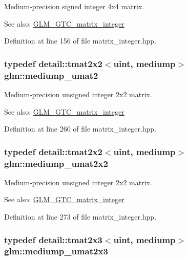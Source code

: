 Medium-precision signed integer 4x4 matrix. \begin{Desc}
\item[See also:]\hyperlink{group__gtc__matrix__integer}{GLM\_\-GTC\_\-matrix\_\-integer} \end{Desc}


Definition at line 156 of file matrix\_\-integer.hpp.\hypertarget{group__gtc__matrix__integer_g388a5b9d7e494d5f5bd30b9e11ded06a}{
\subsubsection[mediump\_\-umat2]{\setlength{\rightskip}{0pt plus 5cm}typedef detail::tmat2x2$<$uint, mediump$>$ {\bf glm::mediump\_\-umat2}}}
\label{group__gtc__matrix__integer_g388a5b9d7e494d5f5bd30b9e11ded06a}


Medium-precision unsigned integer 2x2 matrix. \begin{Desc}
\item[See also:]\hyperlink{group__gtc__matrix__integer}{GLM\_\-GTC\_\-matrix\_\-integer} \end{Desc}


Definition at line 260 of file matrix\_\-integer.hpp.\hypertarget{group__gtc__matrix__integer_g80e478f09c6caa16410198ce78fe8a2b}{
\subsubsection[mediump\_\-umat2x2]{\setlength{\rightskip}{0pt plus 5cm}typedef detail::tmat2x2$<$uint, mediump$>$ {\bf glm::mediump\_\-umat2x2}}}
\label{group__gtc__matrix__integer_g80e478f09c6caa16410198ce78fe8a2b}


Medium-precision unsigned integer 2x2 matrix. \begin{Desc}
\item[See also:]\hyperlink{group__gtc__matrix__integer}{GLM\_\-GTC\_\-matrix\_\-integer} \end{Desc}


Definition at line 273 of file matrix\_\-integer.hpp.\hypertarget{group__gtc__matrix__integer_gaae45c5dbaad1ecd57bfa936d851be1b}{
\subsubsection[mediump\_\-umat2x3]{\setlength{\rightskip}{0pt plus 5cm}typedef detail::tmat2x3$<$uint, mediump$>$ {\bf glm::mediump\_\-umat2x3}}}
\label{group__gtc__matrix__integer_gaae45c5dbaad1ecd57bfa936d851be1b}


